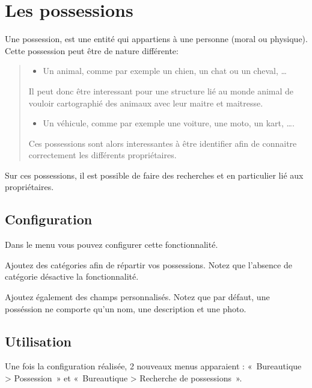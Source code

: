 \documentclass[a4paper,10pt,oneside,french]{sphinxmanual}
\begin{document}
\sphinxstepscope


\section{Les possessions}
\label{\detokenize{contacts/possession:les-possessions}}\label{\detokenize{contacts/possession::doc}}
\sphinxAtStartPar
Une possession, est une entité qui appartiens à une personne (moral ou physique).
Cette possession peut être de nature différente:
\begin{quote}
\begin{itemize}
\item {} 
\sphinxAtStartPar
Un animal, comme par exemple un chien, un chat ou un cheval, …

\end{itemize}

\sphinxAtStartPar
Il peut donc être interessant pour une structure lié au monde animal de vouloir cartographié des animaux avec leur maitre et maitresse.
\begin{itemize}
\item {} 
\sphinxAtStartPar
Un véhicule, comme par exemple une voiture, une moto, un kart, ….

\end{itemize}

\sphinxAtStartPar
Ces possessions sont alors interessantes à être identifier afin de connaitre correctement les différents propriétaires.
\end{quote}

\sphinxAtStartPar
Sur ces possessions, il est possible de faire des recherches et en particulier lié aux propriétaires.


\subsection{Configuration}
\label{\detokenize{contacts/possession:configuration}}
\sphinxAtStartPar
Dans le menu  vous pouvez configurer cette fonctionnalité.

\sphinxAtStartPar
Ajoutez des catégories afin de répartir vos possessions.
Notez que l’absence de catégorie désactive la fonctionnalité.

\sphinxAtStartPar
Ajoutez également des champs personnalisés.
Notez que par défaut, une posséssion ne comporte qu’un nom, une description et une photo.


\subsection{Utilisation}
\label{\detokenize{contacts/possession:utilisation}}
\sphinxAtStartPar
Une fois la configuration réalisée, 2 nouveaux menus apparaient : « Bureautique \textgreater{} Possession » et « Bureautique \textgreater{} Recherche de possessions ».
\end{document}
